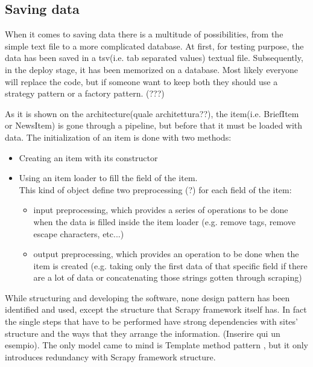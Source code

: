 \subsection{Saving data}
When it comes to saving data there is a multitude of possibilities, from the simple text file to a more complicated database. 
At first, for testing purpose, the data has been saved in a tsv(i.e. tab separated values) textual file. Subsequently, in the deploy stage, it has been memorized on a database. 
Most likely everyone will replace the code, but if someone want to keep both they should use a strategy pattern or a factory pattern. (???)
\par
As it is shown on the architecture(quale architettura??), the item(i.e. BriefItem or NewsItem) is gone through a pipeline, but before that it must be loaded with data.
The initialization of an item is done with two methods:
\begin{itemize}
	\item Creating an item with its constructor
	\item Using an item loader to fill the field of the item.\\
	This kind of object define two preprocessing (?) for each field of the item:
	\begin{itemize}
		\item input preprocessing, which provides a series of operations to be done when the data is filled inside the item loader (e.g. remove tags, remove escape characters, etc...)
		\item output preprocessing, which provides an operation to be done when the item is created (e.g. taking only the first data of that specific field if there are a lot of data or concatenating those strings gotten through scraping)
	\end{itemize}
\end{itemize}
\par While structuring and developing the software, none design pattern has been identified and used, except the structure that Scrapy framework itself has. In fact the single steps that have to be performed have strong dependencies with sites' structure and the ways that they arrange the information. (Inserire qui un esempio). The only model came to mind is Template method pattern \cite{templatepattern}, but it only introduces redundancy with Scrapy framework structure. 


